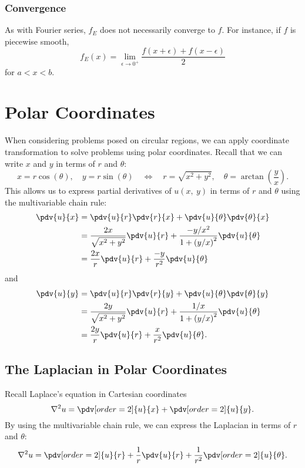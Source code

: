 \documentclass{article}
\begin{document}
\subsubsection{Convergence}
As with Fourier series, \(f_E\) does not necessarily converge to \(f\).
For instance, if \(f\) is piecewise smooth,
\begin{equation*}
    f_E\left( x \right) = \lim_{\epsilon \to 0^+} \frac{f\left( x + \epsilon \right) + f\left( x - \epsilon \right)}{2}
\end{equation*}
for \(a < x < b\).
\section{Polar Coordinates}
When considering problems posed on circular regions, we can apply
coordinate transformation to solve problems using polar coordinates.
Recall that we can write \(x\) and \(y\) in terms of \(r\) and
\(\theta\):
\begin{equation*}
    x = r \cos{\left( \theta \right)}, \quad y = r \sin{\left( \theta \right)} \quad \iff \quad r = \sqrt{x^2 + y^2}, \quad \theta = \arctan{\left( \frac{y}{x} \right)}.
\end{equation*}
This allows us to express partial derivatives of \(u\left( x, \: y \right)\) in terms of \(r\) and \(\theta\) using the multivariable chain rule:
\begin{align*}
    \pdv{u}{x} & = \pdv{u}{r} \pdv{r}{x} + \pdv{u}{\theta} \pdv{\theta}{x}                                        \\
               & = \frac{2x}{\sqrt{x^2 + y^2}} \pdv{u}{r} + \frac{-y/x^2}{1+\left( y/x \right)^2} \pdv{u}{\theta} \\
               & = \frac{2x}{r} \pdv{u}{r} + \frac{-y}{r^2} \pdv{u}{\theta}
\end{align*}
and
\begin{align*}
    \pdv{u}{y} & = \pdv{u}{r} \pdv{r}{y} + \pdv{u}{\theta} \pdv{\theta}{y}                                     \\
               & = \frac{2y}{\sqrt{x^2 + y^2}} \pdv{u}{r} + \frac{1/x}{1+\left( y/x \right)^2} \pdv{u}{\theta} \\
               & = \frac{2y}{r} \pdv{u}{r} + \frac{x}{r^2} \pdv{u}{\theta}.
\end{align*}
\subsection{The Laplacian in Polar Coordinates}
Recall Laplace's equation in Cartesian coordinates
\begin{equation*}
    \nabla^2 u = \pdv[order=2]{u}{x} + \pdv[order=2]{u}{y}.
\end{equation*}
By using the multivariable chain rule, we can express the Laplacian in terms of \(r\) and \(\theta\):
\begin{equation*}
    \nabla^2 u = \pdv[order=2]{u}{r} + \frac{1}{r} \pdv{u}{r} + \frac{1}{r^2} \pdv[order=2]{u}{\theta}.
\end{equation*}
\end{document}
